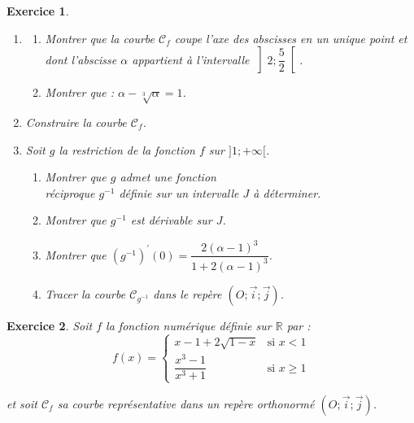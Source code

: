 \documentclass[12pt,a4paper]{article}
\theoremstyle{mystyle}
\newtheorem{exo}{Exercice}
\begin{document}
\begin{multicols*}{2}
\begin{exo}
\begin{enumerate}
    \item 
    \begin{enumerate}
        \item Montrer que la courbe $\mathcal{C}_f$ coupe l'axe des abscisses en un unique point et dont l'abscisse $\alpha$ appartient à l'intervalle $\left] 2 ; \dfrac{5}{2} \right[$.
        \item Montrer que : $\alpha - \sqrt[3]{\alpha} = 1$.
    \end{enumerate}
    \item Construire la courbe $\mathcal{C}_f$.
    \item Soit $g$ la restriction de la fonction $f$ sur $]1 ; + \infty[$.
    \begin{enumerate}
        \item Montrer que $g$ admet une fonction \\réciproque $g^{-1}$ définie sur un intervalle $J$ à déterminer.
        \item Montrer que $g^{-1}$ est dérivable sur $J$.
        \item Montrer que $(g^{-1})^{\prime}(0) = \dfrac{2(\alpha - 1)^3}{1 + 2(\alpha - 1)^3}$.
        \item Tracer la courbe $\mathcal{C}_{g^{-1}}$ dans le repère $(O;\vec{i};\vec{j})$.
    \end{enumerate}
\end{enumerate}

\end{exo}

\begin{exo}
Soit $f$ la fonction numérique définie sur $\mathbb{R}$ par :
\[
f(x) = \begin{cases} 
x - 1 + 2 \sqrt{1 - x} & \text{si } x < 1 \\
\dfrac{x^3 - 1}{x^3 + 1} & \text{si } x \geq 1
\end{cases}
\]

et soit $\mathcal{C}_f$ sa courbe représentative dans un repère orthonormé $(O; \overrightarrow{i}; \overrightarrow{j})$.


\end{exo}
\end{multicols*}
\end{document}
